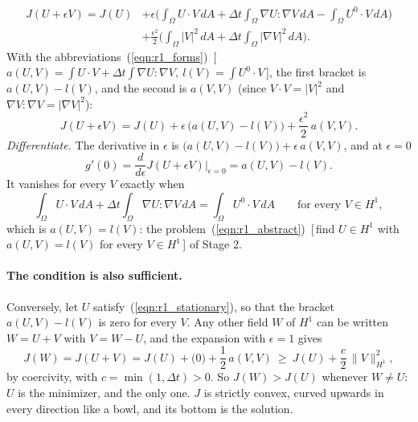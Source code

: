 \begin{align*}
J(U + \epsilon V) = J(U) &+ \epsilon\Big( \int_\Omega U\cdot V\, dA + \Delta t\int_\Omega \nabla U : \nabla V\, dA - \int_\Omega U^0 \cdot V\, dA \Big) \\
&+ \frac{\epsilon^2}{2}\Big(\int_\Omega |V|^2\, dA + \Delta t\int_\Omega |\nabla V|^2\, dA\Big).
\end{align*}
With the abbreviations~(\ref{eqn:r1_forms})~[\,$a(U, V) = \int U\cdot V + \Delta t\int \nabla U:\nabla V,\ l(V) = \int U^0\cdot V$\,], the first bracket is $a(U, V) - l(V)$, and the second is $a(V, V)$ (since $V\cdot V = |V|^2$ and $\nabla V:\nabla V = |\nabla V|^2$):
\begin{equation*}
J(U + \epsilon V) = J(U) + \epsilon\, \big( a(U, V) - l(V) \big) + \frac{\epsilon^2}{2}\, a(V, V) .
\end{equation*}
\emph{Differentiate.} The derivative in $\epsilon$ is $\big(a(U, V) - l(V)\big) + \epsilon\, a(V, V)$, and at $\epsilon = 0$
\begin{equation*}
g'(0) = \frac{d}{d\epsilon} J(U + \epsilon V)\Big|_{\epsilon = 0} = a(U, V) - l(V) .
\end{equation*}
It vanishes for every $V$ exactly when
\begin{equation}
\label{eqn:r1_stationary}
\int_\Omega U\cdot V\, dA + \Delta t\int_\Omega \nabla U : \nabla V\, dA = \int_\Omega U^0 \cdot V\, dA \qquad \text{for every } V \in H^1,
\end{equation}
which is $a(U, V) = l(V)$: the problem~(\ref{eqn:r1_abstract})~[\,find $U\in H^1$ with $a(U, V) = l(V)$ for every $V\in H^1$\,] of Stage 2.

\paragraph{The condition is also sufficient.} Conversely, let $U$ satisfy~(\ref{eqn:r1_stationary}), so that the bracket $a(U, V) - l(V)$ is zero for every $V$. Any other field $W$ of $H^1$ can be written $W = U + V$ with $V = W - U$, and the expansion with $\epsilon = 1$ gives
\begin{equation*}
J(W) = J(U + V) = J(U) + \big(0\big) + \frac12\, a(V, V) \ \geq\ J(U) + \frac{c}{2}\, \|V\|_{H^1}^2 ,
\end{equation*}
by coercivity, with $c = \min(1, \Delta t) > 0$. So $J(W) > J(U)$ whenever $W \neq U$: $U$ is the minimizer, and the only one. $J$ is strictly convex, curved upwards in every direction like a bowl, and its bottom is the solution.

